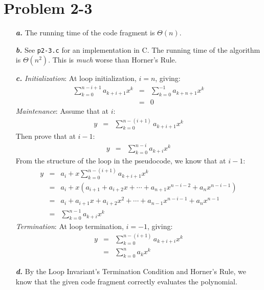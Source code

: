\documentclass{article}
\begin{document}
\section*{Problem 2-3}

\noindent\begin{enumerate}
	\item[\textbf{\textit{a.}}]
		The running time of the code fragment is $\Theta(n)$.

	\item[\textbf{\textit{b.}}]
		See \texttt{p2-3.c} for an implementation in C. The running time of the algorithm is $\Theta(n^2)$. This is \textit{much} worse than Horner's Rule.

	\item[\textbf{\textit{c.}}]
		\textit{Initialization}: At loop initialization, $i=n$, giving:
		\begin{eqnarray*}
			\sum_{k=0}^{n-i+1} a_{k+i+1} x^k & = & \sum_{k=0}^{-1} a_{k+n+1} x^k \\
			& = & 0
		\end{eqnarray*}
		\textit{Maintenance}: Assume that at $i$:
		\begin{eqnarray*}
			y & = & \sum_{k=0}^{n-(i+1)} a_{k+i+1} x^k
		\end{eqnarray*}
		Then prove that at $i-1$:
		\begin{eqnarray*}
			y & = & \sum_{k=0}^{n-i} a_{k+i} x^k
		\end{eqnarray*}
		From the structure of the loop in the pseudocode, we know that at $i-1$:
		\begin{eqnarray*}
			y & = & a_i + x \sum_{k=0}^{n-(i+1)} a_{k+i+1} x^k \\
			& = & a_i + x \left ( a_{i+1} + a_{i+2} x + \cdots + a_{n+1} x^{n-i-2} + a_n x^{n-i-1} \right ) \\
			& = & a_i + a_{i+1} x + a_{i+2} x^2 + \cdots + a_{n-1} x^{n-i-1} + a_n x^{n-1} \\
			& = & \sum_{k=0}^{n-1} a_{k+i} x^k
		\end{eqnarray*}
		\textit{Termination}: At loop termination, $i=-1$, giving:
		\begin{eqnarray*}
			y & = & \sum_{k=0}^{n-(i+1)} a_{k+i+i} x^k \\
			& = & \sum_{k=0}^n a_k x^k
		\end{eqnarray*}

	\item[\textbf{\textit{d.}}] By the Loop Invariant's Termination Condition and Horner's Rule, we know that the given code fragment correctly evaluates the polynomial.
\end{enumerate}
\end{document}
